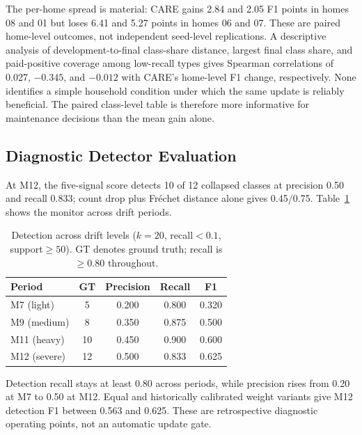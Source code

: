\documentclass[journal]{IEEEtran}
\begin{document}
The per-home spread is material: CARE gains 2.84 and 2.05 F1 points in homes 08 and 01 but loses 6.41 and 5.27 points in homes 06 and 07. These are paired home-level outcomes, not independent seed-level replications. A descriptive analysis of development-to-final class-share distance, largest final class share, and paid-positive coverage among low-recall types gives Spearman correlations of 0.027, $-0.345$, and $-0.012$ with CARE's home-level F1 change, respectively. None identifies a simple household condition under which the same update is reliably beneficial. The paired class-level table is therefore more informative for maintenance decisions than the mean gain alone.

\subsection{Diagnostic Detector Evaluation}
\label{sec:detection_eval}


At M12, the five-signal score detects 10 of 12 collapsed classes at precision 0.50 and recall 0.833; count drop plus Fr\'{e}chet distance alone gives 0.45/0.75. Table~\ref{tab:trigger} shows the monitor across drift periods.

\begin{table}[!htbp]
\centering
\caption{Detection across drift levels ($k{=}20$, recall${<}0.1$, support${\geq}50$). GT denotes ground truth; recall is $\geq$0.80 throughout.}
\label{tab:trigger}
\small
\begin{tabular}{@{}l cccc@{}}
\toprule
Period & GT & Precision & Recall & F1 \\
\midrule
M7 (light)   & 5  & 0.200 & 0.800 & 0.320 \\
M9 (medium)  & 8  & 0.350 & 0.875 & 0.500 \\
M11 (heavy)  & 10 & 0.450 & 0.900 & 0.600 \\
M12 (severe) & 12 & 0.500 & 0.833 & 0.625 \\
\bottomrule
\end{tabular}
\end{table}


Detection recall stays at least 0.80 across periods, while precision rises from 0.20 at M7 to 0.50 at M12. Equal and historically calibrated weight variants give M12 detection F1 between 0.563 and 0.625. These are retrospective diagnostic operating points, not an automatic update gate.

\end{document}
